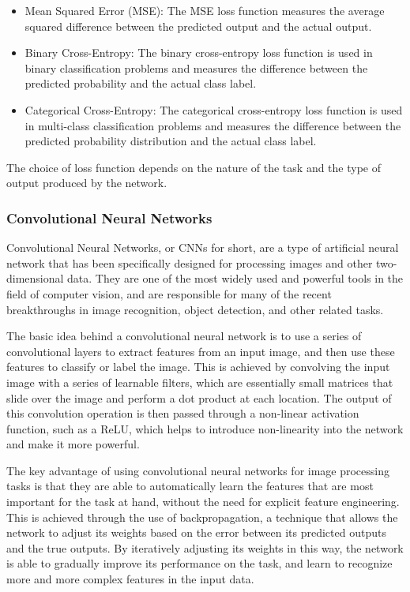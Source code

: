 \begin{itemize}
    \item Mean Squared Error (MSE): The MSE loss function measures the average squared difference between the predicted output and the actual output.
    \item Binary Cross-Entropy: The binary cross-entropy loss function is used in binary classification problems and measures the difference between the predicted probability and the actual class label.
    \item Categorical Cross-Entropy: The categorical cross-entropy loss function is used in multi-class classification problems and measures the difference between the predicted probability distribution and the actual class label.
\end{itemize}

The choice of loss function depends on the nature of the task and the type of output produced by the network.

\subsubsection*{Convolutional Neural Networks}

Convolutional Neural Networks, or CNNs for short, are a type of artificial neural network that has been specifically designed for processing images and other two-dimensional data. They are one of the most widely used and powerful tools in the field of computer vision, and are responsible for many of the recent breakthroughs in image recognition, object detection, and other related tasks.

The basic idea behind a convolutional neural network is to use a series of convolutional layers to extract features from an input image, and then use these features to classify or label the image. This is achieved by convolving the input image with a series of learnable filters, which are essentially small matrices that slide over the image and perform a dot product at each location. The output of this convolution operation is then passed through a non-linear activation function, such as a ReLU, which helps to introduce non-linearity into the network and make it more powerful.

The key advantage of using convolutional neural networks for image processing tasks is that they are able to automatically learn the features that are most important for the task at hand, without the need for explicit feature engineering. This is achieved through the use of backpropagation, a technique that allows the network to adjust its weights based on the error between its predicted outputs and the true outputs. By iteratively adjusting its weights in this way, the network is able to gradually improve its performance on the task, and learn to recognize more and more complex features in the input data.

